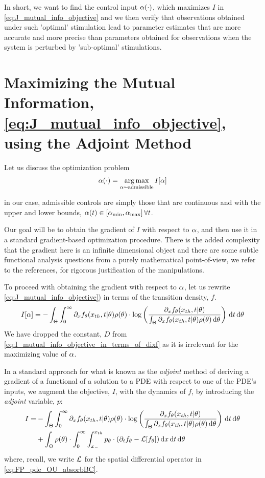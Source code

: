 In short, we want to find the control input $\alpha(\cdot)$, which maximizes $I$ in
\cref{eq:J_mutual_info_objective} and we then verify that observations obtained
under such 'optimal' stimulation lead to parameter estimates that are more
accurate and more precise than parameters obtained for observations when the
system is perturbed by 'sub-optimal' stimulations.

\section{Maximizing the Mutual Information,
\cref{eq:J_mutual_info_objective}, using the Adjoint Method}
\label{sec:maximizing_MI}
Let us discuss the optimization problem
$$
\a(\cdot) = \argmax_{\a \sim \textrm{admissible}} I[\a]
$$ 

in our case, admissible controls are simply those that are continuous and with
the upper and lower bounds, $\alpha(t) \in [{ \alpha_{\textrm{min}} }, { \alpha_{\textrm{max}} }] \,  \forall t$.

Our goal will be to obtain the gradient of $I$ with respect to $\alpha$, and then
use it in a standard gradient-based optimization procedure. There is the added
complexity that the gradient here is an infinite dimensional object and there
are some subtle functional analysis questions from a purely mathematical
point-of-view, we refer to the references, \cite{Lenhart2007,Borzi2012} for
rigorous justification of the manipulations. 

To proceed with obtaining the gradient with respect to $\alpha$, let us rewrite \cref{eq:J_mutual_info_objective}) in terms of the transition density, $f$. 
\begin{equation}
I[\alpha] = 
- \int_\Theta \int_0^\infty
	   {\partial}_xf_{ \theta}({ x_{th} }, t|{ \theta})  \rho({ \theta}) \cdot 
		\log \left( \frac{{\partial}_xf_{ \theta}({ x_{th} }, t|{ \theta})}
						{\int_\Theta {\partial}_xf_{ \theta}({ x_{th} }, t|{ \theta})\rho({ \theta})
\, \mathrm{d} { \theta} } \right)
\, \mathrm{d} t\, \mathrm{d} { \theta}
\label{eq:I_mutual_info_objective_in_terms_of_dixf} 
\end{equation}
We have dropped the constant, $D$ from
\cref{eq:I_mutual_info_objective_in_terms_of_dixf} as it is irrelevant for
the maximizing value of $\alpha$.

 In a standard approach for what
is known as the {\sl adjoint}  method of deriving a gradient of a
functional of a solution to a PDE with respect to one of the PDE's inputs, we
augment the objective, $I$, with the dynamics of $f$, by introducing the {\sl
adjoint} variable, $p$: 
\begin{align}
I=&  -
\int_\Theta \int_0^\infty 
	  {\partial}_xf_{ \theta}({ x_{th} }, t|{ \theta})  \rho({ \theta}) \cdot 
		\log \left( \frac{{\partial}_xf_{ \theta}({ x_{th} }, t|{ \theta})}
						{\int_\Theta {\partial}_xf_{ \theta}({ x_{th} }, t|{ \theta})\rho({ \theta})\, \mathrm{d} { \theta} } \right)
\, \mathrm{d} t\, \mathrm{d} { \theta} 
\\
	  &+ \int_\Theta  \rho({ \theta}) \cdot \int_0^\infty \int_{x_-}^{{ x_{th} }}
	  		p_{ \theta} \cdot ({\partial}_t f_{ \theta} -	  { \mathcal{L} }[f_{ \theta}]) 
  				\, \mathrm{d} x	  \, \mathrm{d} t \, \mathrm{d} { \theta}
	  \label{eq:adjoint_term_in_objective} 
\end{align}
where, recall, we write ${ \mathcal{L} }$ for the spatial differential operator in 
\cref{eq:FP_pde_OU_absorbBC}.


